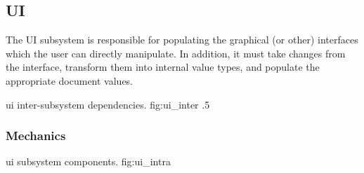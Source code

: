 \subsection{UI}
The UI subsystem is responsible for populating the graphical (or other) interfaces which the user can directly manipulate.
In addition, it must take changes from the interface, transform them into internal value types, and populate the appropriate document values.

{ui inter-subsystem dependencies.}
{fig:ui_inter}
{.5}

\subsubsection{Mechanics}
{ui subsystem components.}
{fig:ui_intra}
